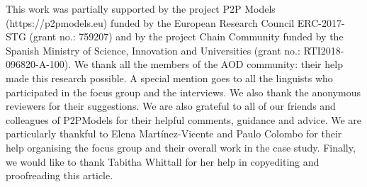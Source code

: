 \documentclass[manuscript]{acmart}
\begin{document}




\maketitle










\begin{acks}
This work was partially supported by the project P2P Models (https://p2pmodels.eu) funded by the European Research Council ERC-2017-STG (grant no.: 759207) and by the project Chain Community funded by the Spanish Ministry of Science, Innovation and Universities (grant no.: RTI2018-096820-A-100). We thank all the members of the AOD community: their help made this research possible. A special mention goes to all the linguists who participated in the focus group and the interviews. We also thank the anonymous reviewers for their suggestions. We are also grateful to all of our friends and colleagues of P2PModels for their helpful comments, guidance and advice. We are particularly thankful to Elena Martínez-Vicente and Paulo Colombo for their help organising the focus group and their overall work in the case study. Finally, we would like to thank Tabitha Whittall for her help in copyediting and proofreading this article.
\end{acks}




\end{document}
